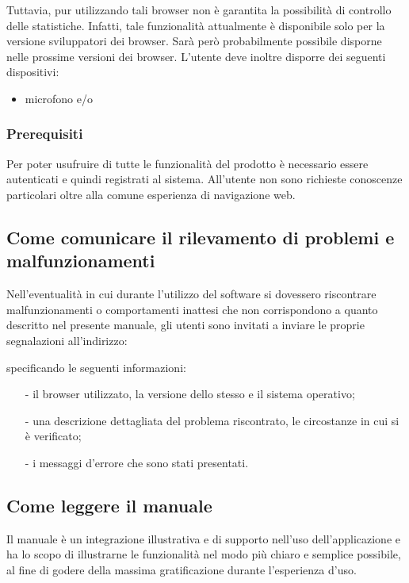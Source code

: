 Tuttavia, pur utilizzando tali browser non è garantita la possibilità di controllo delle statistiche. Infatti, tale funzionalità attualmente è disponibile solo per la versione sviluppatori dei browser. Sarà però probabilmente possibile disporne nelle prossime versioni dei browser.
L'utente deve inoltre disporre dei seguenti dispositivi:
\begin{itemize}
  \item microfono e/o  
 \end{itemize}
 
 
\subsubsection{Prerequisiti}
Per poter usufruire di tutte le funzionalità del prodotto è necessario essere autenticati e quindi registrati al sistema.
All'utente non sono richieste conoscenze particolari oltre alla comune esperienza di navigazione web.

\subsection{Come comunicare il rilevamento di problemi e malfunzionamenti}
Nell'eventualità in cui durante l'utilizzo del software \caName{} si dovessero riscontrare malfunzionamenti o comportamenti inattesi che non corrispondono a quanto descritto nel presente manuale, gli utenti sono invitati a inviare le proprie segnalazioni all'indirizzo:
\begin{center}
  \email{}
\end{center}
specificando le seguenti informazioni:
\begin{itemize}[noitemsep,nolistsep]
  \item[-] il browser utilizzato, la versione dello stesso e il sistema operativo;
  \item[-] una descrizione dettagliata del problema riscontrato, le circostanze in cui si è verificato;
  \item[-] i messaggi d'errore che sono stati presentati.
\end{itemize}

\subsection{Come leggere il manuale}
Il manuale è un integrazione illustrativa e di supporto nell'uso dell'applicazione \caName e ha lo scopo di illustrarne le funzionalità nel modo più chiaro e semplice possibile, al fine di godere della massima gratificazione durante l'esperienza d'uso.

